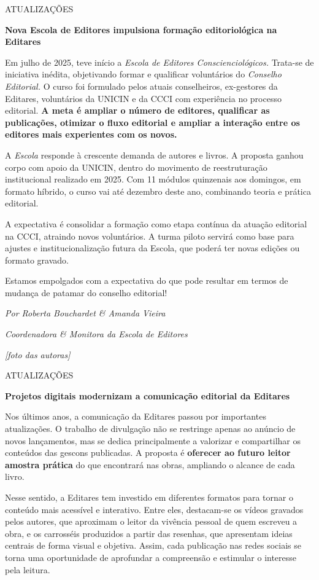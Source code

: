 ATUALIZAÇÕES

\textbf{Nova Escola de Editores impulsiona formação editoriológica na Editares}

Em julho de 2025, teve início a \emph{Escola de Editores Conscienciológicos.} Trata-se de iniciativa inédita, objetivando formar e qualificar voluntários do \emph{Conselho Editorial.} O curso foi formulado pelos atuais conselheiros, ex-gestores da Editares, voluntários da UNICIN e da CCCI com experiência no processo editorial. \textbf{A meta é ampliar o número de editores, qualificar as publicações, otimizar o fluxo editorial e ampliar a interação entre os editores mais experientes com os novos.}

A \emph{Escola} responde à crescente demanda de autores e livros. A proposta ganhou corpo com apoio da UNICIN, dentro do movimento de reestruturação institucional realizado em 2025. Com 11 módulos quinzenais aos domingos, em formato híbrido, o curso vai até dezembro deste ano, combinando teoria e prática editorial.

A expectativa é consolidar a formação como etapa contínua da atuação editorial na CCCI, atraindo novos voluntários. A turma piloto servirá como base para ajustes e institucionalização futura da Escola, que poderá ter novas edições ou formato gravado.

Estamos empolgados com a expectativa do que pode resultar em termos de mudança de patamar do conselho editorial!

\emph{Por Roberta Bouchardet \& Amanda Vieira}

\emph{Coordenadora \& Monitora da Escola de Editores}

\emph{{[}foto das autoras{]}}

ATUALIZAÇÕES

\textbf{Projetos digitais modernizam a comunicação editorial da Editares}

Nos últimos anos, a comunicação da Editares passou por importantes atualizações. O trabalho de divulgação não se restringe apenas ao anúncio de novos lançamentos, mas se dedica principalmente a valorizar e compartilhar os conteúdos das gescons publicadas. A proposta é \textbf{oferecer ao futuro leitor amostra prática} do que encontrará nas obras, ampliando o alcance de cada livro.

Nesse sentido, a Editares tem investido em diferentes formatos para tornar o conteúdo mais acessível e interativo. Entre eles, destacam-se os vídeos gravados pelos autores, que aproximam o leitor da vivência pessoal de quem escreveu a obra, e os carrosséis produzidos a partir das resenhas, que apresentam ideias centrais de forma visual e objetiva. Assim, cada publicação nas redes sociais se torna uma oportunidade de aprofundar a compreensão e estimular o interesse pela leitura.

